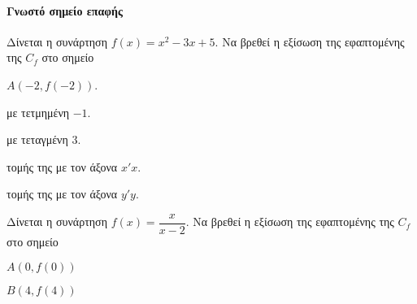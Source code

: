 \documentclass[11pt,a4paper,modern]{FFExercises}
\begin{document}
\paragraph{Γνωστό σημείο επαφής}
\askhsh Δίνεται η συνάρτηση $f(x)=x^2-3x+5$. Να βρεθεί η εξίσωση της εφαπτομένης της $C_f$ στο σημείο
\begin{alist}
\item $A(-2,f(-2))$.
\item με τετμημένη $-1$.
\item με τεταγμένη $3$.
\item τομής της με τον άξονα $x'x$.
\item τομής της με τον άξονα $y'y$.
\end{alist}
\askhsh Δίνεται η συνάρτηση $f(x)=\dfrac{x}{x-2}$. Να βρεθεί η εξίσωση της εφαπτομένης της $C_f$ στο σημείο
\begin{multicols}{2}
\begin{alist}
\item $A(0,f(0))$
\item $B(4,f(4))$
\end{alist}
\end{multicols}
\askhsh 
\end{document}
